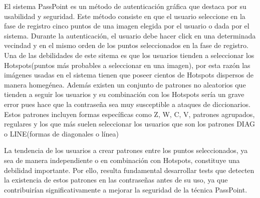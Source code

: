 \documentclass[12pt]{report}
\begin{document}
	El sistema PassPoint\cite{1} es un método de autenticación gráfica que destaca por su usabilidad y seguridad. Este método consiste  en que el usuario seleccione en la fase de registro  cinco puntos de una imagen elegida por el usuario o dada por el sistema. Durante la autenticación, el usuario debe hacer click en una determinada vecindad y en el mismo orden de los puntos seleccionados en la fase de  registro. Una de las debilidades de este sitema es que los usuarios tienden a seleccionar los Hotspots\cite{4}(puntos más probables a seleccionar en una imagen), por esta razón las imágenes usadas en el sistema tienen que poseer cientos de Hotspots dispersos de manera homegénea. Además existen un conjunto de patrones no aleatorios que tienden a seguir los usuarios y su combinación con los Hotspots sería un grave error pues hace que la contraseña sea muy susceptible a ataques de diccionarios. Estos patrones incluyen formas específicas como Z, W, C, V, patrones agrupados, regulares y los que más suelen seleccionar los usuarios  que son los  patrones DIAG o LINE\cite{5}(formas de diagonales o línea)
	
	
	La tendencia de los usuarios a crear patrones entre los puntos seleccionados, ya sea de manera independiente o en combinación con Hotspots, constituye una debilidad importante. Por ello, resulta fundamental desarrollar tests que detecten la existencia de estos patrones en las contraseñas antes de su uso, ya que contribuirían significativamente a mejorar la seguridad de la técnica PassPoint.
	
	
\end{document}
